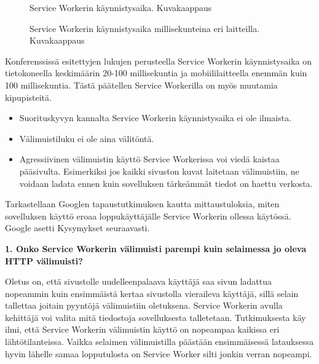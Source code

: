 \documentclass{tktltiki}
\begin{document}
\begin{figure}[h]
\begin{center}
\caption{Service Workerin käynnistysaika. Kuvakaappaus \cite{GoogleDevSummit}}
\label{SW bootup time}
\end{center}
\end{figure}

\begin{figure}[h]
\begin{center}
\caption{Service Workerin käynnistysaika millisekunteina eri laitteilla. Kuvakaappaus \cite{GoogleDevSummit}}
\label{SW bootup time on device}
\end{center}
\end{figure}

\clearpage

Konferenssissä esitettyjen lukujen perusteella Service Workerin käynnistysaika on tietokoneella keskimäärin 20-100 millisekuntia ja mobiililaitteella enemmän kuin 100 millisekuntia. Tästä päätellen Service Workerilla on myös muutamia kipupisteitä.

\begin{itemize}
  \item Suorituskyvyn kannalta Service Workerin käynnistysaika ei ole ilmaista. 
  \item Välimuistiluku ei ole aina välitöntä.
  \item Agressiivinen välimuistin käyttö Service Workerissa voi viedä kaistaa pääsivulta. Esimerkiksi jos kaikki sivuston kuvat laitetaan välimuistiin, ne voidaan ladata ennen kuin sovelluksen tärkeämmät tiedot on haettu verkosta.
\end{itemize}

Tarkastellaan Googlen tapaustutkimuksen kautta mittaustuloksia, miten sovelluksen käyttö eroaa loppukäyttäjälle Service Workerin ollessa käytössä. Google asetti Kysymykset seuraavasti.

\textbf{1. Onko Service Workerin välimuisti parempi kuin selaimessa jo oleva HTTP välimuisti?}

Oletus on, että sivustolle uudelleenpalaava käyttäjä saa sivun ladattua nopeammin kuin ensimmäistä kertaa sivustolla vieraileva käyttäjä, sillä selain tallettaa joitain pyyntöjä välimuistiin oletuksena. Service Workerin avulla kehittäjä voi valita mitä tiedostoja sovelluksesta talletetaan. Tutkimuksesta käy ilmi, että Service Workerin välimuistin käyttö on nopeampaa kaikissa eri lähtötilanteissa. Vaikka selaimen välimuistilla päästään ensimmäisessä latauksessa hyvin lähelle samaa lopputulosta on Service Worker silti jonkin verran nopeampi.
\end{document}
